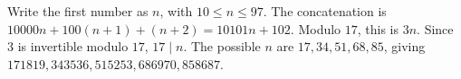 Write the first number as $n$, with $10\le n\le 97$. The concatenation is $10000n+100(n+1)+(n+2)=10101n+102$. Modulo $17$, this is $3n$. Since $3$ is invertible modulo $17$, $17\mid n$. The possible $n$ are $17,34,51,68,85$, giving $\boxed{171819,343536,515253,686970,858687}$.

